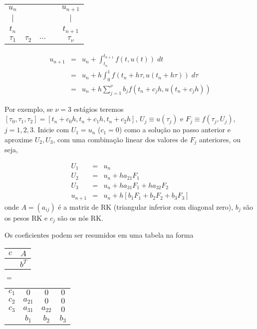 \begin{center}
\begin{tabular}{ccccc}
  $u_n$ &      &       &      & $u_{n+1}$ \\
  $|$   &      &       &      &  $|$  \\ \hline
  $t_n$ &      &       &      & $t_{n+1}$ \\
  $\tau _1$  & $\tau _2$ & $\cdots $ &      & $\tau _\nu $
\end{tabular}
\end{center}

\begin{eqnarray}
  u_{n+1}  &=&u_n  + \int _{t_n}^{t_{n+1}} f(t,u(t)) \; dt \\
           &=&u_n  + h\int _0^1f(t_n+h\tau ,u(t_n+h\tau )) \; d\tau  \\
           &=&u_n  + h\sum_{j=1}^\nu  b_jf(t_n+c_jh,u(t_n+c_jh))
\end{eqnarray}


Por exemplo, se $\nu =3$ estágios teremos $[\tau _0,\tau _1,\tau _2]=[t_n+c_0h,t_n+c_1h,t_n+c_2h]$, $U_j\equiv u(\tau _j)$ e $F_j\equiv f(\tau _j,U_j)$, $j=1,2,3$. Inicie com  $U_1=u_n$ ($c_1=0$) como a solução no passo anterior e aproxime $U_2,U_3$, com uma combinação linear dos valores de $F_j$ anteriores, ou seja,

\begin{eqnarray}\label{RKa}
  U_1 &=&u_n \\
  U_2 &=&u_n  + h a_{21}F_1 \\
  U_3 &=&u_n  + h a_{31}F_1 +h a_{32}F_2 \\ \label{RK}
  u_{n+1}&=&u_n  + h [ b_1F_1+b_2F_2+b_3F_3]
\end{eqnarray}
 onde $A=(a_{ij})$ é a matriz de RK (triangular inferior com diagonal zero), $b_j$ são os pesos RK e $c_j$ são os nós RK.

Os coeficientes podem ser resumidos em uma tabela na forma

\begin{tabular}{c|c}
  $c$ & $A$     \\  \hline
      & $b^T$
\end{tabular}
$=$
\begin{tabular}{c|ccc}
  $c_1$  & $0$      & $0$      & $0$ \\
  $c_2$  & $a_{21}$ & $0$      & $0$ \\
  $c_3$ & $a_{31}$ & $a_{22}$ & $0$\\  \hline
        & $b_1$     & $b_2$     & $b_3$
\end{tabular}


